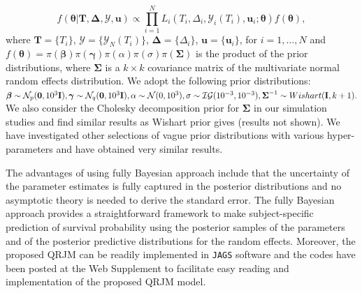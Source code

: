 \documentclass[Crown, sagev, times, doublespace]{sagej}
\begin{document}
\begin{equation}\label{eqn:posterior}
f(\boldsymbol{\theta}|\boldsymbol{T}, \boldsymbol{\Delta}, \boldsymbol{\mathcal{Y}}, \boldsymbol{u})\propto \prod_{i=1}^N L_i(T_i, \Delta_i, \mathcal{Y}_{i}(T_i), \boldsymbol{u}_i;\boldsymbol{\theta}) f(\boldsymbol{\theta}),
\end{equation}
where $\boldsymbol{T}=\{T_i\}$, $\boldsymbol{\mathcal{Y}}=\{ \mathcal{Y}_{N}(T_i)\}$, $\boldsymbol{\Delta} =\{\Delta_i\}$, $\boldsymbol{u}=\{\boldsymbol{u}_i\}$, for $i=1, \ldots, N$ and $f(\boldsymbol{\theta})=\pi(\boldsymbol{\beta})\pi(\boldsymbol{\gamma})\pi(\alpha)\pi(\sigma)\pi(\boldsymbol{\Sigma})$ is the product of the prior distributions,
where $\boldsymbol{\Sigma}$ is a $k\times k$ covariance matrix of the multivariate normal random effects distribution. We adopt the following prior distributions:
$\boldsymbol{\beta} \sim \mathcal{N}_p({\boldsymbol 0}, 10^3{\bf I}), \boldsymbol{\gamma} \sim \mathcal{N}_q({\boldsymbol 0}, 10^3{\bf I}), \alpha\sim \mathcal{N}(0, 10^3), \sigma\sim \mathcal{IG}(10^{-3}, 10^{-3}), \boldsymbol{\Sigma}^{-1}\sim Wishart({\bf I}, k+1).$ We also consider the Cholesky decomposition prior for $\boldsymbol{\Sigma}$ in our simulation studies and find similar results as Wishart prior gives (results not shown). We have investigated other selections of vague prior distributions with various hyper-parameters and have obtained very similar results.

The advantages of using fully Bayesian approach include that the uncertainty of the parameter estimates is fully captured in the posterior distributions and no asymptotic theory is needed to derive the standard error. The fully Bayesian approach provides a straightforward framework to make subject-specific prediction of survival probability using the posterior samples of the parameters and of the posterior predictive distributions for the random effects. Moreover, the proposed QRJM can be readily implemented in \texttt{JAGS} software \citep{plummer2003jags} and the codes have been posted at the Web Supplement to facilitate easy reading and implementation of the proposed QRJM model.
\end{document}
